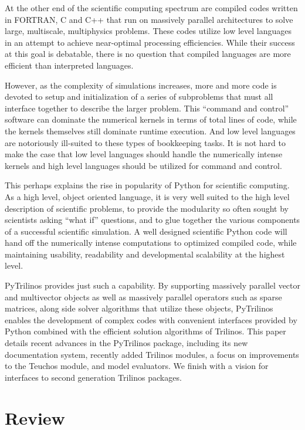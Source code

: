 \documentclass[11pt]{article}
\begin{document}
At the other end of the scientific computing spectrum are compiled codes written in FORTRAN, C and C++ that run on massively parallel architectures to solve large, multiscale, multiphysics problems.  These codes utilize low level languages in an attempt to achieve near-optimal processing efficiencies.  While their success at this goal is debatable, there is no question that compiled languages are more efficient than interpreted languages.

However, as the complexity of simulations increases, more and more code is devoted to setup and initialization of a series of subproblems that must all interface together to describe the larger problem.  This ``command and control'' software can dominate the numerical kernels in terms of total lines of code, while the kernels themselves still dominate runtime execution.  And low level languages are notoriously ill-suited to these types of bookkeeping tasks.  It is not hard to make the case that low level languages should handle the numerically intense kernels and high level languages should be utilized for command and control.

This perhaps explains the rise in popularity of Python for scientific computing.  As a high level, object oriented language, it is very well suited to the high level description of scientific problems, to provide the modularity so often sought by scientists asking ``what if'' questions, and to glue together the various components of a successful scientific simulation.  A well designed scientific Python code will hand off the numerically intense computations to optimized compiled code, while maintaining usability, readability and developmental scalability at the highest level.

PyTrilinos provides just such a capability.  By supporting massively parallel vector and multivector objects as well as massively parallel operators such as sparse matrices, along side solver algorithms that utilize these objects, PyTrilinos enables the development of complex codes with  convenient interfaces provided by Python combined with the efficient solution algorithms of Trilinos.  This paper details recent advances in the PyTrilinos package, including its new documentation system, recently added Trilinos modules, a focus on improvements to the Teuchos module, and model evaluators.  We finish with a vision for interfaces to second generation Trilinos packages.

\section{Review}
\label{sec:review}
\end{document}
